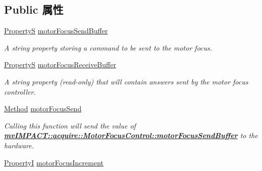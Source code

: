 \subsection*{Public 属性}
\begin{DoxyCompactItemize}
\item 
\hyperlink{classmv_i_m_p_a_c_t_1_1acquire_1_1_property_s}{Property\+S} \hyperlink{classmv_i_m_p_a_c_t_1_1acquire_1_1_motor_focus_control_a4670bcf5c3ffe82afc04de1deaea292e}{motor\+Focus\+Send\+Buffer}
\begin{DoxyCompactList}\small\item\em A string property storing a command to be sent to the motor focus. \end{DoxyCompactList}\item 
\hypertarget{classmv_i_m_p_a_c_t_1_1acquire_1_1_motor_focus_control_ae1318dcd821e35abdb35337352d1c5b6}{\hyperlink{classmv_i_m_p_a_c_t_1_1acquire_1_1_property_s}{Property\+S} \hyperlink{classmv_i_m_p_a_c_t_1_1acquire_1_1_motor_focus_control_ae1318dcd821e35abdb35337352d1c5b6}{motor\+Focus\+Receive\+Buffer}}\label{classmv_i_m_p_a_c_t_1_1acquire_1_1_motor_focus_control_ae1318dcd821e35abdb35337352d1c5b6}

\begin{DoxyCompactList}\small\item\em A string property {\bfseries }(read-\/only) that will contain answers sent by the motor focus controller. \end{DoxyCompactList}\item 
\hyperlink{classmv_i_m_p_a_c_t_1_1acquire_1_1_method}{Method} \hyperlink{classmv_i_m_p_a_c_t_1_1acquire_1_1_motor_focus_control_a52ccaf1b60154618b17112d50209cee3}{motor\+Focus\+Send}
\begin{DoxyCompactList}\small\item\em Calling this function will send the value of {\bfseries \hyperlink{classmv_i_m_p_a_c_t_1_1acquire_1_1_motor_focus_control_a4670bcf5c3ffe82afc04de1deaea292e}{mv\+I\+M\+P\+A\+C\+T\+::acquire\+::\+Motor\+Focus\+Control\+::motor\+Focus\+Send\+Buffer}} to the hardware. \end{DoxyCompactList}\item 
\hypertarget{classmv_i_m_p_a_c_t_1_1acquire_1_1_motor_focus_control_ab7b8de1875dfaf3ee35e2e9edc5b4284}{\hyperlink{group___common_interface_ga12d5e434238ca242a1ba4c6c3ea45780}{Property\+I} \hyperlink{classmv_i_m_p_a_c_t_1_1acquire_1_1_motor_focus_control_ab7b8de1875dfaf3ee35e2e9edc5b4284}{motor\+Focus\+Increment}}\label{classmv_i_m_p_a_c_t_1_1acquire_1_1_motor_focus_control_ab7b8de1875dfaf3ee35e2e9edc5b4284}


\end{DoxyCompactItemize}
